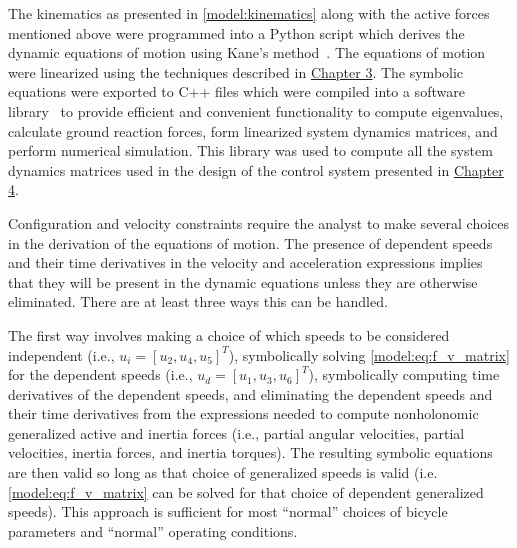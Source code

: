 The kinematics as presented in \autoref{model:kinematics} along with the active
forces mentioned above were programmed into a Python script which derives the
dynamic equations of motion using Kane's method~\cite{Kane1985}. The equations
of motion were linearized using the techniques described in \hyperref[chapter3]{Chapter 3}.
The symbolic equations were exported to C++ files which were compiled
into a software library~\cite{libbicycle} to provide efficient and
convenient functionality to compute eigenvalues, calculate ground reaction
forces, form linearized system dynamics matrices, and perform numerical
simulation. This library was used to compute all the system dynamics matrices
used in the design of the control system presented in \hyperref[chapter4]{Chapter 4}.

Configuration and velocity constraints require the analyst to make several
choices in the derivation of the equations of motion. The presence of dependent
speeds and their time derivatives in the velocity and acceleration expressions
implies that they will be present in the dynamic equations unless they are
otherwise eliminated. There are at least three ways this can be handled.

The first way involves making a choice of which speeds to be considered
independent (i.e., $u_i=[u_2, u_4, u_5]^T$), symbolically solving
\autoref{model:eq:f_v_matrix} for the dependent speeds (i.e., $u_d = [u_1, u_3,
u_6]^T$), symbolically computing time derivatives of the dependent speeds, and
eliminating the dependent speeds and their time derivatives from the
expressions needed to compute nonholonomic generalized active and inertia
forces (i.e., partial angular velocities, partial velocities, inertia forces,
and inertia torques). The resulting symbolic equations are then valid so long
as that choice of generalized speeds is valid (i.e.
\autoref{model:eq:f_v_matrix} can be solved for that choice of dependent
generalized speeds). This approach is sufficient for most ``normal'' choices of
bicycle parameters and ``normal'' operating conditions.

